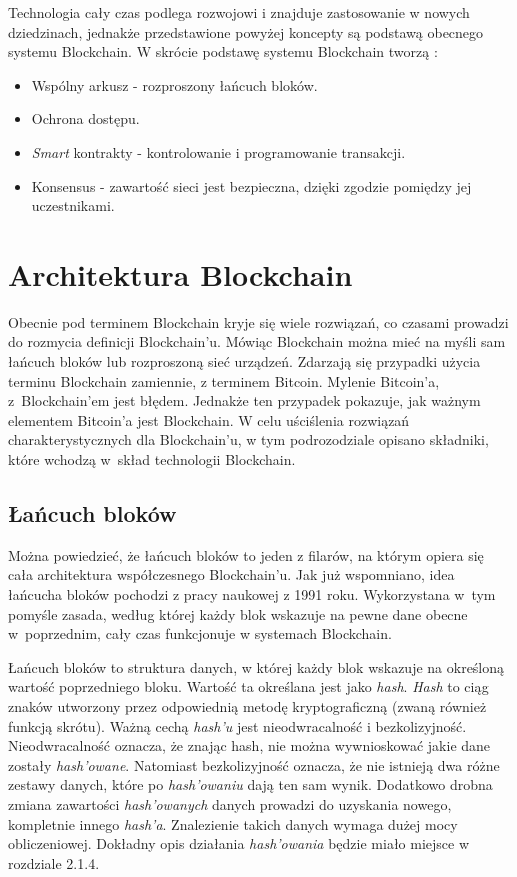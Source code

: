 \documentclass[a4paper,12pt]{book}
\begin{document}
Technologia cały czas podlega rozwojowi i znajduje zastosowanie w nowych dziedzinach, jednakże przedstawione powyżej koncepty są podstawą obecnego systemu Blockchain. W skrócie podstawę systemu Blockchain tworzą \cite{business}:
\begin{itemize}
	\item Wspólny arkusz - rozproszony łańcuch bloków.
	\item Ochrona dostępu.
	\item \textit{Smart} kontrakty - kontrolowanie i programowanie transakcji.
	\item Konsensus - zawartość sieci jest bezpieczna, dzięki zgodzie pomiędzy jej uczestnikami.
\end{itemize}

\section{Architektura Blockchain}

Obecnie pod terminem Blockchain kryje się wiele rozwiązań, co czasami prowadzi do rozmycia definicji Blockchain'u. Mówiąc Blockchain można mieć na myśli sam łańcuch bloków lub rozproszoną sieć urządzeń. Zdarzają się przypadki użycia terminu Blockchain zamiennie, z terminem Bitcoin\cite{bitcoin-vs-blockchain}. Mylenie Bitcoin'a, z~Blockchain'em jest błędem. Jednakże ten przypadek pokazuje, jak ważnym elementem Bitcoin'a jest Blockchain. W celu uściślenia rozwiązań charakterystycznych dla Blockchain'u, w tym podrozodziale opisano składniki, które wchodzą w~skład technologii Blockchain.

\subsection{Łańcuch bloków}

Można powiedzieć, że łańcuch bloków to jeden z filarów, na którym opiera się cała architektura współczesnego Blockchain'u. Jak już wspomniano, idea łańcucha bloków pochodzi z pracy naukowej z 1991 roku. Wykorzystana w~tym pomyśle zasada, według której każdy blok wskazuje na pewne dane obecne w~poprzednim, cały czas funkcjonuje w systemach Blockchain.

Łańcuch bloków to struktura danych, w której każdy blok wskazuje na określoną wartość poprzedniego bloku. Wartość ta określana jest jako \textit{hash}. \textit{Hash} to ciąg znaków utworzony przez odpowiednią metodę kryptograficzną (zwaną również funkcją skrótu). Ważną cechą \textit{hash'u} jest nieodwracalność i bezkolizyjność. Nieodwracalność oznacza, że znając hash, nie można wywnioskować jakie dane zostały \textit{hash'owane}. Natomiast bezkolizyjność oznacza, że nie istnieją dwa różne zestawy danych, które po \textit{hash'owaniu} dają ten sam wynik. Dodatkowo drobna zmiana zawartości \textit{hash'owanych} danych prowadzi do uzyskania nowego, kompletnie innego \textit{hash'a}. Znalezienie takich danych wymaga dużej mocy obliczeniowej\cite{hash}. Dokładny opis działania \textit{hash'owania} będzie miało miejsce w rozdziale 2.1.4.
\end{document}
